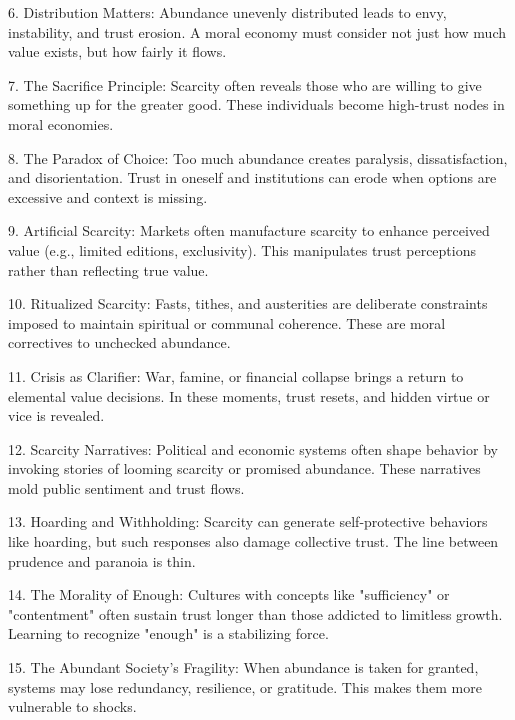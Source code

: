 \documentclass[11pt,oneside]{book}
\begin{document}
6. Distribution Matters: Abundance unevenly distributed leads to envy, instability, and trust erosion. A moral economy must consider not just how much value exists, but how fairly it flows.



7. The Sacrifice Principle: Scarcity often reveals those who are willing to give something up for the greater good. These individuals become high-trust nodes in moral economies.



8. The Paradox of Choice: Too much abundance creates paralysis, dissatisfaction, and disorientation. Trust in oneself and institutions can erode when options are excessive and context is missing.



9. Artificial Scarcity: Markets often manufacture scarcity to enhance perceived value (e.g., limited editions, exclusivity). This manipulates trust perceptions rather than reflecting true value.



10. Ritualized Scarcity: Fasts, tithes, and austerities are deliberate constraints imposed to maintain spiritual or communal coherence. These are moral correctives to unchecked abundance.



11. Crisis as Clarifier: War, famine, or financial collapse brings a return to elemental value decisions. In these moments, trust resets, and hidden virtue or vice is revealed.



12. Scarcity Narratives: Political and economic systems often shape behavior by invoking stories of looming scarcity or promised abundance. These narratives mold public sentiment and trust flows.



13. Hoarding and Withholding: Scarcity can generate self-protective behaviors like hoarding, but such responses also damage collective trust. The line between prudence and paranoia is thin.



14. The Morality of Enough: Cultures with concepts like "sufficiency" or "contentment" often sustain trust longer than those addicted to limitless growth. Learning to recognize "enough" is a stabilizing force.



15. The Abundant Society’s Fragility: When abundance is taken for granted, systems may lose redundancy, resilience, or gratitude. This makes them more vulnerable to shocks.
\end{document}
